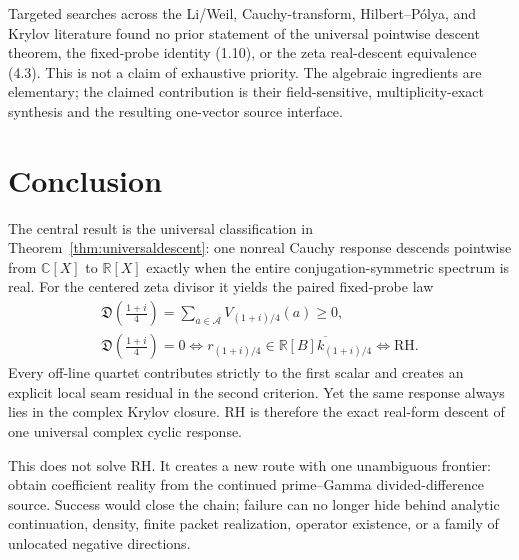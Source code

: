 \documentclass[11pt]{article}
\theoremstyle{definition}
\theoremstyle{remark}
\newcommand{\C}{\mathbb C}
\newcommand{\R}{\mathbb R}
\newcommand{\cA}{\mathcal A}
\begin{document}
\enlargethispage{\baselineskip}
Targeted searches across the Li/Weil, Cauchy-transform, Hilbert--P\'olya, and Krylov literature
found no prior statement of the universal pointwise descent theorem, the fixed-probe identity
(1.10), or the zeta real-descent equivalence (4.3).  This is not a claim of exhaustive priority.
The algebraic ingredients are elementary; the claimed contribution is their field-sensitive,
multiplicity-exact synthesis and the resulting one-vector source interface.

\section{Conclusion}

The central result is the universal classification in
Theorem~\ref{thm:universaldescent}: one nonreal Cauchy response descends pointwise from
$\C[X]$ to $\R[X]$ exactly when the entire conjugation-symmetric spectrum is real.  For the
centered zeta divisor it yields the paired fixed-probe law
\[
 \boxed{
 \begin{gathered}
 \mathfrak D\!\left(\frac{1+i}{4}\right)
   =\sum_{a\in\cA}V_{(1+i)/4}(a)\geq0,\\
 \mathfrak D\!\left(\frac{1+i}{4}\right)=0
   \Longleftrightarrow
 r_{(1+i)/4}\in\overline{\R[B]k_{(1+i)/4}}
   \Longleftrightarrow\mathrm{RH}.
 \end{gathered}}                                         \tag{9.1}
\]
Every off-line quartet contributes strictly to the first scalar and creates an explicit local
seam residual in the second criterion.  Yet the same response always lies in the complex Krylov
closure.  RH is therefore the exact real-form descent of one universal complex cyclic response.

This does not solve RH.  It creates a new route with one unambiguous frontier: obtain coefficient
reality from the continued prime--Gamma divided-difference source.  Success would close the chain;
failure can no longer hide behind analytic continuation, density, finite packet realization,
operator existence, or a family of unlocated negative directions.
\end{document}
